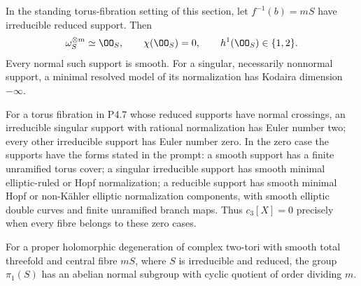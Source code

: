 
\begin{proposition}[P4.12]\hypertarget{tag-02WJ}{}\label{night:P4.12}\label{stmt:P4.12}


In the standing torus-fibration setting of this section, let $f^{-1}(b)=mS$
have irreducible reduced support. Then
\[
 \omega_S^{\otimes m}\simeq\OO_S,\qquad
 \chi(\OO_S)=0,\qquad h^1(\OO_S)\in\{1,2\}.
\]
Every normal such support is smooth. For a singular, necessarily
nonnormal support, a minimal resolved model of its normalization
has Kodaira dimension $-\infty$.
\end{proposition}

\begin{proposition}[P4.8]\hypertarget{tag-02Y0}{}\label{night:P4.8}\label{stmt:P4.8}


For a torus fibration in P4.7 whose reduced supports have normal
crossings, an irreducible singular support with
rational normalization has Euler number two; every other irreducible
support has Euler number zero. In the zero case the supports have the
forms stated in the prompt: a smooth support has a finite unramified
torus cover; a singular irreducible support has smooth minimal
elliptic-ruled or Hopf normalization; a reducible support has smooth
minimal Hopf or non-Kähler elliptic normalization components, with
smooth elliptic double curves and finite unramified branch maps.
Thus $c_3[X]=0$ precisely when every fibre belongs to these zero cases.
\end{proposition}

\begin{proposition}[P4R.1]\hypertarget{tag-02Y2}{}\label{night:P4R.1}\label{stmt:P4R.1}


For a proper holomorphic degeneration of complex two-tori with
smooth total threefold and central fibre $mS$, where $S$ is
irreducible and reduced, the group $\pi_1(S)$ has an abelian
normal subgroup with cyclic quotient of order dividing $m$.
\end{proposition}

